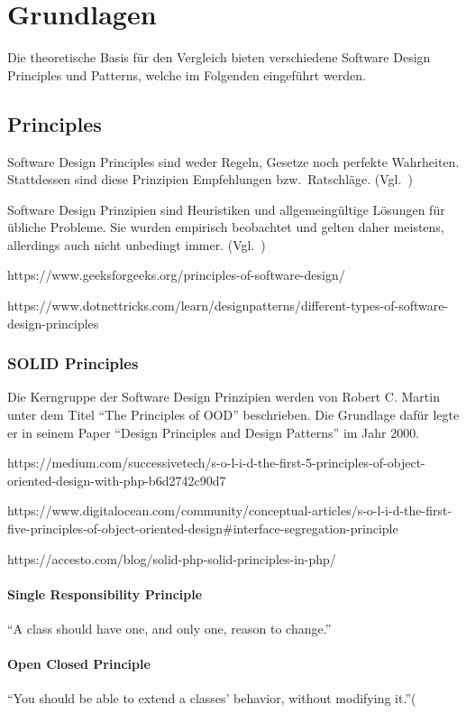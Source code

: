 \section{Grundlagen}
Die theoretische Basis für den Vergleich bieten verschiedene Software Design Principles und Patterns, welche
im Folgenden eingeführt werden.

\subsection{Principles}
Software Design Principles sind weder Regeln, Gesetze noch perfekte Wahrheiten.
Stattdessen sind diese Prinzipien Empfehlungen bzw.\ Ratschläge.
(Vgl.~\cite{getting-a-solid-start})

Software Design Prinzipien sind Heuristiken und allgemeingültige Lösungen für übliche Probleme.
Sie wurden empirisch beobachtet und gelten daher meistens, allerdings auch nicht unbedingt immer.
(Vgl.~\cite{getting-a-solid-start})

https://www.geeksforgeeks.org/principles-of-software-design/

https://www.dotnettricks.com/learn/designpatterns/different-types-of-software-design-principles

\subsubsection{SOLID Principles}
Die Kerngruppe der Software Design Prinzipien werden von Robert C. Martin unter dem Titel \enquote{The Principles of OOD}\cite{solid} beschrieben.
Die Grundlage dafür legte er in seinem Paper \enquote{Design Principles and Design Patterns}\cite{design-principles-and-design-patterns} im Jahr 2000.

https://medium.com/successivetech/s-o-l-i-d-the-first-5-principles-of-object-oriented-design-with-php-b6d2742c90d7

https://www.digitalocean.com/community/conceptual-articles/s-o-l-i-d-the-first-five-principles-of-object-oriented-design#interface-segregation-principle

https://accesto.com/blog/solid-php-solid-principles-in-php/

\paragraph{Single Responsibility Principle}
\enquote{A class should have one, and only one, reason to change.}\cite{solid}

\paragraph{Open Closed Principle}
\enquote{You should be able to extend a classes' behavior, without modifying it.}(\cite{solid}

